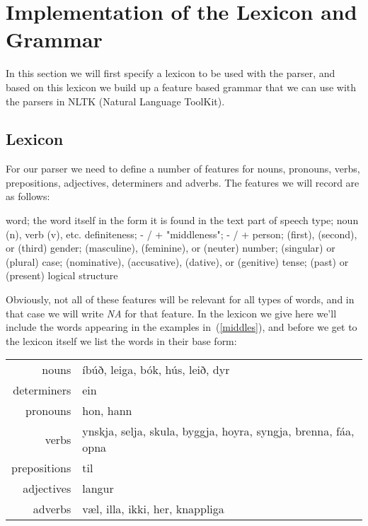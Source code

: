 \documentclass[12pt,%
]{lin-v2/lin}
\let\Oldsubsection\subsection
\renewcommand{\subsection}{\FloatBarrier\Oldsubsection}
\newcommand{\pref}[1]{(\ref{#1})}
\begin{document}
\section{Implementation of the Lexicon and Grammar}

In this section we will first specify a lexicon to be used with the parser,
and based on this lexicon we build up a feature based grammar that we can use
with the parsers in NLTK (Natural Language ToolKit).

\subsection{Lexicon}

For our parser we need to define a number of features for nouns, pronouns, verbs,
prepositions, adjectives, determiners and adverbs. The features we will record are as follows:
\begin{exe}
    \ex\label{features}
    \begin{xlist}
    \ex word; the word itself in the form it is found in the text
    \ex part of speech type; noun (n), verb (v), etc.
    \ex definiteness; \Def-{} / \Def+{}
    \ex "middleness"; \Mid-{} / \Mid+{}
    \ex person; \First{} (first), \Second{} (second), or \Third{} (third)
    \ex gender; \M{} (masculine), \F{} (feminine), or \N{} (neuter) 
    \ex number; \Sg{} (singular) or \Pl{} (plural)
    \ex case; \Nom{} (nominative), \Acc{} (accusative), \Dat{} (dative), or \Gen{} (genitive)
    \ex tense; \Pst{} (past) or \Prs{} (present) 
    \ex logical structure
    \end{xlist}
\end{exe}

Obviously, not all of these features will be relevant for all types of words, and in that case
we will write \emph{NA} for that feature. In the lexicon we give here we'll include
the words appearing in the examples in~\pref{middles}, and before we get to the lexicon itself
we list the words in their base form:
\begin{table}[!htbp]
    \begin{tabular}{rl}
        {nouns} & íbúð, leiga, bók, hús, leið, dyr \\
        {determiners} & ein \\
        {pronouns} & hon, hann \\
        {verbs} & ynskja, selja, skula, byggja, hoyra, syngja, brenna, fáa, opna \\
        {prepositions} & til \\
        {adjectives} & langur \\
        {adverbs} & væl, illa, ikki, her, knappliga \\
    \end{tabular}
\end{table}
\end{document}
